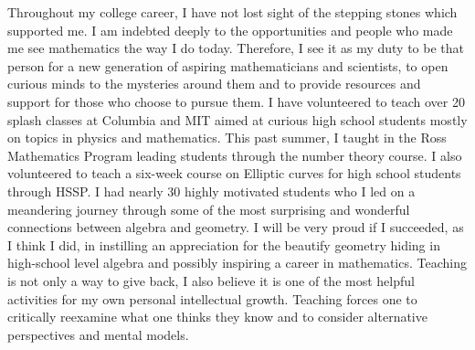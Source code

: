 \documentclass[11pt]{amsart}
\begin{document}
Throughout my college career, I have not lost sight of the stepping stones which supported me. I am indebted deeply to the opportunities and people who made me see mathematics the way I do today. Therefore, I see it as my duty to be that person for a new generation of aspiring mathematicians and scientists, to open curious minds to the mysteries around them and to provide resources and support for those who choose to pursue them. 
I have volunteered to teach over 20 splash classes at Columbia and MIT aimed at curious high school students mostly on topics in physics and mathematics.
This past summer, I taught in the Ross Mathematics Program leading students through the number theory course. I also volunteered to teach a six-week course on Elliptic curves for high school students through HSSP. I had nearly 30 highly motivated students who I led on a meandering journey through some of the most surprising and wonderful connections between algebra and geometry. I will be very proud if I succeeded, as I think I did, in instilling an appreciation for the beautify geometry hiding in high-school level algebra and possibly inspiring a career in mathematics. Teaching is not only a way to give back, I also believe it is one of the most helpful activities for my own personal intellectual growth. Teaching forces one to critically reexamine what one thinks they know and to consider alternative perspectives and mental models. 
\par
\end{document}
